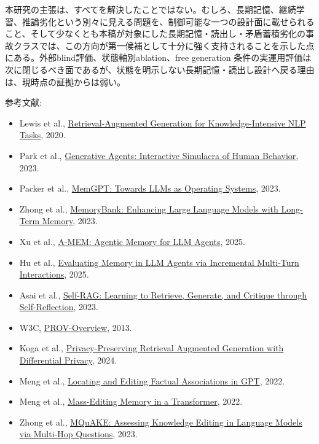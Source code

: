 \documentclass[12pt,a4paper]{article}
\begin{document}
本研究の主張は、すべてを解決したことではない。むしろ、長期記憶、継続学習、推論劣化という別々に見える問題を、制御可能な一つの設計面に載せられること、そして少なくとも本稿が対象にした長期記憶・読出し・矛盾蓄積劣化の事故クラスでは、この方向が第一候補として十分に強く支持されることを示した点にある。外部blind評価、状態軸別ablation、free generation 条件の実運用評価は次に閉じるべき面であるが、状態を明示しない長期記憶・読出し設計へ戻る理由は、現時点の証拠からは弱い。

参考文献:

\begin{itemize}
\tightlist
\item
  Lewis et al., \href{https://arxiv.org/abs/2005.11401}{Retrieval-Augmented Generation for Knowledge-Intensive NLP Tasks}, 2020.
\item
  Park et al., \href{https://arxiv.org/abs/2304.03442}{Generative Agents: Interactive Simulacra of Human Behavior}, 2023.
\item
  Packer et al., \href{https://arxiv.org/abs/2310.08560}{MemGPT: Towards LLMs as Operating Systems}, 2023.
\item
  Zhong et al., \href{https://arxiv.org/abs/2305.10250}{MemoryBank: Enhancing Large Language Models with Long-Term Memory}, 2023.
\item
  Xu et al., \href{https://arxiv.org/abs/2502.12110}{A-MEM: Agentic Memory for LLM Agents}, 2025.
\item
  Hu et al., \href{https://arxiv.org/abs/2507.05257}{Evaluating Memory in LLM Agents via Incremental Multi-Turn Interactions}, 2025.
\item
  Asai et al., \href{https://arxiv.org/abs/2310.11511}{Self-RAG: Learning to Retrieve, Generate, and Critique through Self-Reflection}, 2023.
\item
  W3C, \href{https://www.w3.org/TR/prov-overview/}{PROV-Overview}, 2013.
\item
  Koga et al., \href{https://arxiv.org/abs/2412.04697}{Privacy-Preserving Retrieval Augmented Generation with Differential Privacy}, 2024.
\item
  Meng et al., \href{https://arxiv.org/abs/2202.05262}{Locating and Editing Factual Associations in GPT}, 2022.
\item
  Meng et al., \href{https://arxiv.org/abs/2210.07229}{Mass-Editing Memory in a Transformer}, 2022.
\item
  Zhong et al., \href{https://arxiv.org/abs/2305.14795}{MQuAKE: Assessing Knowledge Editing in Language Models via Multi-Hop Questions}, 2023.

\end{itemize}
\end{document}

